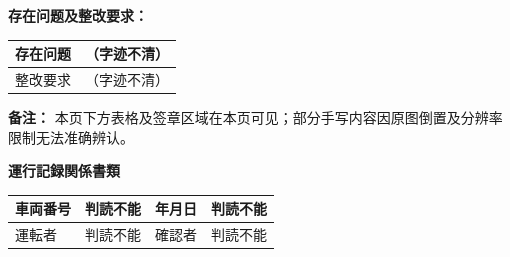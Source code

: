 \documentclass[UTF8,10pt,a4paper,fontset=fandol]{ctexart}
\newcommand{\fieldvalue}[1]{#1}
\newcommand{\handwritten}[1]{#1}
\begin{document}
\vspace{0.5em}

\noindent
\textbf{存在问题及整改要求：}

\begin{tabularx}{\textwidth}{|X|X|}
\hline
存在问题 &
\fieldvalue{\handwritten{（字迹不清）}}
\\
\hline
整改要求 &
\fieldvalue{\handwritten{（字迹不清）}}
\\
\hline
\end{tabularx}

\vspace{0.5em}

\noindent
\textbf{备注：} 本页下方表格及签章区域在本页可见；部分手写内容因原图倒置及分辨率限制无法准确辨认。


\newpage

\begin{center}
\textbf{運行記録関係書類}
\end{center}

\noindent
\begin{tabularx}{\textwidth}{|l|X|l|X|}
\hline
車両番号 & 
\fieldvalue{\handwritten{判読不能}} &
年月日 &
\fieldvalue{\handwritten{判読不能}} \\
\hline
運転者 & 
\fieldvalue{\handwritten{判読不能}} &
確認者 &
\fieldvalue{\handwritten{判読不能}} \\
\hline
\end{tabularx}

\vspace{1em}
\end{document}
